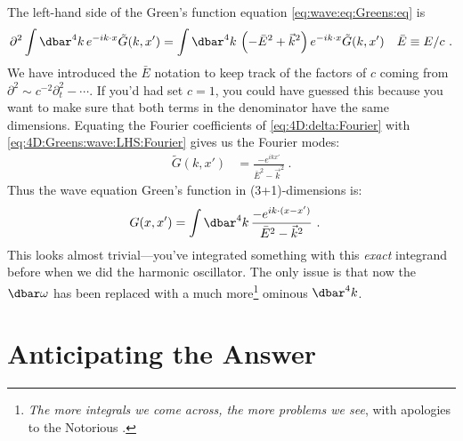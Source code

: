 The left-hand side of the Green's function equation \eqref{eq:wave:eq:Greens:eq} is 
\begin{align}
  \partial^2 \int \dbar^4k \, e^{-ik\cdot x} \tilde G(k,x')
  &=
  \int \dbar^4k \, \left(-\bar{E}^2+\vec{k}^2\right) e^{-ik\cdot x} \tilde G(k,x')
  &
  \bar{E}\equiv E/c
   \ .
  \label{eq:4D:Greens:wave:LHS:Fourier}
\end{align}
We have introduced the $\bar E$ notation to keep track of the factors of $c$ coming from $\partial^2 \sim c^{-2}\partial_t^2 -\cdots$. If you'd had set $c=1$, you could have guessed this because you want to make sure that both terms in the denominator have the same dimensions.
Equating the Fourier coefficients of \eqref{eq:4D:delta:Fourier} with \eqref{eq:4D:Greens:wave:LHS:Fourier} gives us the Fourier modes:
\begin{align}
  \tilde G(k,x') &= \frac{-e^{ikx'}}{\bar{E}^2 - \vec{k}^2} \ .
\end{align}
Thus the wave equation Green's function in (3+1)-dimensions is:
\begin{align}
  G(x,x') &= \int \dbar^4k \, \frac{-e^{ik\cdot (x-x')}}{\bar{E}^2 - \vec{k}^2} \ .
  \label{eq:Greens:function:For:4D:int}
\end{align}
This looks almost trivial---you've integrated something with this \emph{exact} integrand before when we did the harmonic oscillator. The only issue is that now the $\dbar\omega$ has been replaced with a much more\footnote{\emph{The more integrals we come across, the more problems we see}, with apologies to the Notorious .} ominous $\dbar^4k$. 

\section{Anticipating the Answer}

